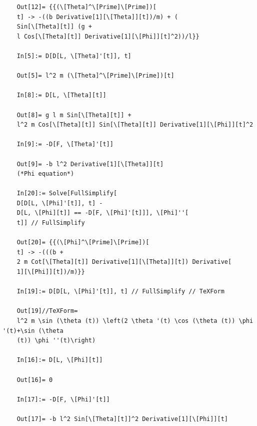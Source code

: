 \documentclass{article}
\theoremstyle{definition}
\begin{document}
\begin{enumerate}[label = (\alph*)]
\begin{lstlisting}
	Out[12]= {{(\[Theta]^\[Prime]\[Prime])[
	t] -> -((b Derivative[1][\[Theta]][t])/m) + (
	Sin[\[Theta][t]] (g + 
	l Cos[\[Theta][t]] Derivative[1][\[Phi]][t]^2))/l}}
	
	In[5]:= D[D[L, \[Theta]'[t]], t]
	
	Out[5]= l^2 m (\[Theta]^\[Prime]\[Prime])[t]
	
	In[8]:= D[L, \[Theta][t]]
	
	Out[8]= g l m Sin[\[Theta][t]] + 
	l^2 m Cos[\[Theta][t]] Sin[\[Theta][t]] Derivative[1][\[Phi]][t]^2
	
	In[9]:= -D[F, \[Theta]'[t]]
	
	Out[9]= -b l^2 Derivative[1][\[Theta]][t]
	(*Phi equation*)
	
	In[20]:= Solve[FullSimplify[
	D[D[L, \[Phi]'[t]], t] - 
	D[L, \[Phi][t]] == -D[F, \[Phi]'[t]]], \[Phi]''[
	t]] // FullSimplify
	
	Out[20]= {{(\[Phi]^\[Prime]\[Prime])[
	t] -> -(((b + 
	2 m Cot[\[Theta][t]] Derivative[1][\[Theta]][t]) Derivative[
	1][\[Phi]][t])/m)}}
	
	In[19]:= D[D[L, \[Phi]'[t]], t] // FullSimplify // TeXForm
	
	Out[19]//TeXForm=
	l^2 m \sin (\theta (t)) \left(2 \theta '(t) \cos (\theta (t)) \phi '(t)+\sin (\theta
	(t)) \phi ''(t)\right)
	
	In[16]:= D[L, \[Phi][t]]
	
	Out[16]= 0
	
	In[17]:= -D[F, \[Phi]'[t]]
	
	Out[17]= -b l^2 Sin[\[Theta][t]]^2 Derivative[1][\[Phi]][t]
	\end{lstlisting}
\end{enumerate} 
\end{document}
